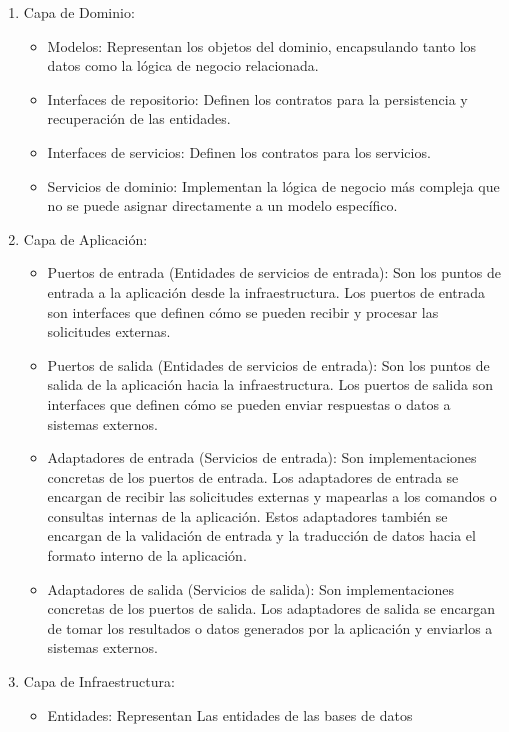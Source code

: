 \documentclass[executivepaper]{article}
\begin{document}
\begin{enumerate}
    \item Capa de Dominio:
   \begin{itemize}
        \item Modelos: Representan los objetos del dominio, encapsulando tanto los datos como la lógica de negocio relacionada.
        \item Interfaces de repositorio: Definen los contratos para la persistencia y recuperación de las entidades.
        \item Interfaces de servicios: Definen los contratos para los servicios.
        \item Servicios de dominio: Implementan la lógica de negocio más compleja que no se puede asignar directamente a un modelo específico.
    \end{itemize}
    \item Capa de Aplicación:
   \begin{itemize}
        \item Puertos de entrada (Entidades de servicios de entrada): Son los puntos de entrada a la aplicación desde la infraestructura. Los puertos de entrada son interfaces que definen cómo se pueden recibir y procesar las solicitudes externas.
        \item Puertos de salida (Entidades de servicios de entrada): Son los puntos de salida de la aplicación hacia la infraestructura. Los puertos de salida son interfaces que definen cómo se pueden enviar respuestas o datos a sistemas externos.
        \item Adaptadores de entrada (Servicios de entrada): Son implementaciones concretas de los puertos de entrada. Los adaptadores de entrada se encargan de recibir las solicitudes externas y mapearlas a los comandos o consultas internas de la aplicación. Estos adaptadores también se encargan de la validación de entrada y la traducción de datos hacia el formato interno de la aplicación.
        \item Adaptadores de salida (Servicios de salida): Son implementaciones concretas de los puertos de salida. Los adaptadores de salida se encargan de tomar los resultados o datos generados por la aplicación y enviarlos a sistemas externos.
    \end{itemize}
    \item Capa de Infraestructura:
   \begin{itemize}
        \item Entidades: Representan Las entidades de las bases de datos

\end{itemize}
\end{enumerate}
\end{document}
